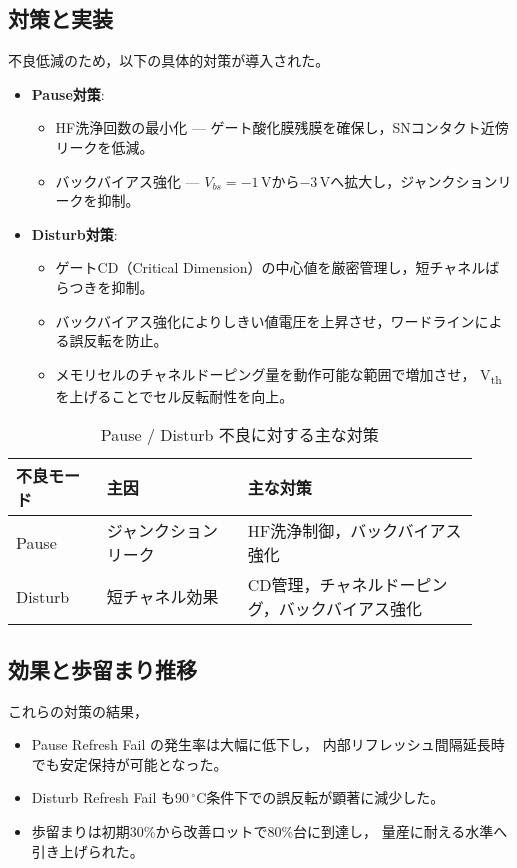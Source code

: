 \documentclass[conference]{IEEEtran}
\begin{document}
\subsection{対策と実装}
不良低減のため，以下の具体的対策が導入された。
\begin{itemize}
  \item \textbf{Pause対策}:
    \begin{itemize}
      \item HF洗浄回数の最小化 — ゲート酸化膜残膜を確保し，SNコンタクト近傍リークを低減。
      \item バックバイアス強化 — $V_{bs}=-1$\,Vから$-3$\,Vへ拡大し，ジャンクションリークを抑制。
    \end{itemize}
  \item \textbf{Disturb対策}:
    \begin{itemize}
      \item ゲートCD（Critical Dimension）の中心値を厳密管理し，短チャネルばらつきを抑制。
      \item バックバイアス強化によりしきい値電圧を上昇させ，ワードラインによる誤反転を防止。
      \item メモリセルのチャネルドーピング量を動作可能な範囲で増加させ，
            V\textsubscript{th} を上げることでセル反転耐性を向上。
    \end{itemize}
\end{itemize}

\begin{table}[t]
\centering
\caption{Pause / Disturb 不良に対する主な対策}
\begin{tabular}{p{0.18\linewidth} p{0.28\linewidth} p{0.46\linewidth}}
\toprule
不良モード & 主因 & 主な対策 \\
\midrule
Pause   & ジャンクションリーク 
        & HF洗浄制御，バックバイアス強化 \\
Disturb & 短チャネル効果 
        & CD管理，チャネルドーピング，バックバイアス強化 \\
\bottomrule
\end{tabular}
\end{table}

\subsection{効果と歩留まり推移}
これらの対策の結果，
\begin{itemize}
  \item Pause Refresh Fail の発生率は大幅に低下し，
        内部リフレッシュ間隔延長時でも安定保持が可能となった。
  \item Disturb Refresh Fail も90\,$^\circ$C条件下での誤反転が顕著に減少した。
  \item 歩留まりは初期30\%から改善ロットで80\%台に到達し，
        量産に耐える水準へ引き上げられた。
\end{itemize}
\end{document}
